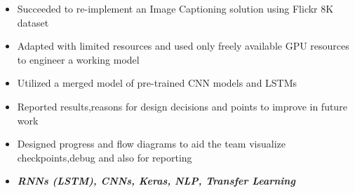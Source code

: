 \documentclass[10pt,a4paper]{altacv}
\begin{document}

\begin{fullwidth}
\makecvheader
\end{fullwidth}



\begin{itemize}
\item Succeeded to re-implement an Image Captioning solution using Flickr 8K dataset
\item Adapted with limited resources and used only freely available GPU resources to engineer a working model
\item Utilized a merged  model of pre-trained CNN models and LSTMs
\item Reported results,reasons for design decisions and points to improve in future work 
\item Designed progress and flow diagrams to aid the team  visualize checkpoints,debug and also for reporting
\item \textit{\textbf{RNNs (LSTM), CNNs, Keras, NLP, Transfer Learning}}
\end{itemize}

\divider

\end{document}
